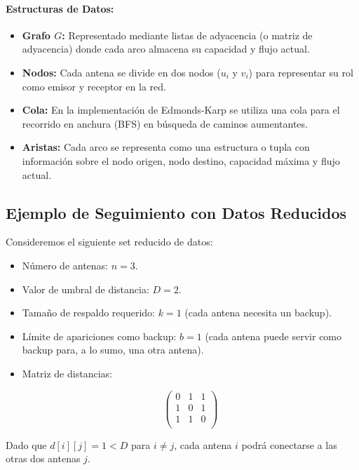 \documentclass[a4paper, 12pt]{article}
\begin{document}
\paragraph{Estructuras de Datos:}
\begin{itemize}
    \item \textbf{Grafo \(G\):} Representado mediante listas de adyacencia (o matriz de adyacencia) donde cada arco almacena su capacidad y flujo actual.
    \item \textbf{Nodos:} Cada antena se divide en dos nodos (\(u_i\) y \(v_i\)) para representar su rol como emisor y receptor en la red.
    \item \textbf{Cola:} En la implementación de Edmonds-Karp se utiliza una cola para el recorrido en anchura (BFS) en búsqueda de caminos aumentantes.
    \item \textbf{Aristas:} Cada arco se representa como una estructura o tupla con información sobre el nodo origen, nodo destino, capacidad máxima y flujo actual.
\end{itemize}
\subsection{Ejemplo de Seguimiento con Datos Reducidos}

Consideremos el siguiente set reducido de datos:

\begin{itemize}
    \item Número de antenas: \( n = 3 \).
    \item Valor de umbral de distancia: \( D = 2 \).
    \item Tamaño de respaldo requerido: \( k = 1 \) (cada antena necesita un backup).
    \item Límite de apariciones como backup: \( b = 1 \) (cada antena puede servir como backup para, a lo sumo, una otra antena).
    \item Matriz de distancias:
      

\[
      \begin{pmatrix}
      0 & 1 & 1 \\
      1 & 0 & 1 \\
      1 & 1 & 0 \\
      \end{pmatrix}
      \]


\end{itemize}

Dado que \(d[i][j] = 1 < D\) para \(i \neq j\), cada antena \(i\) podrá conectarse a las otras dos antenas \(j\).
\end{document}
